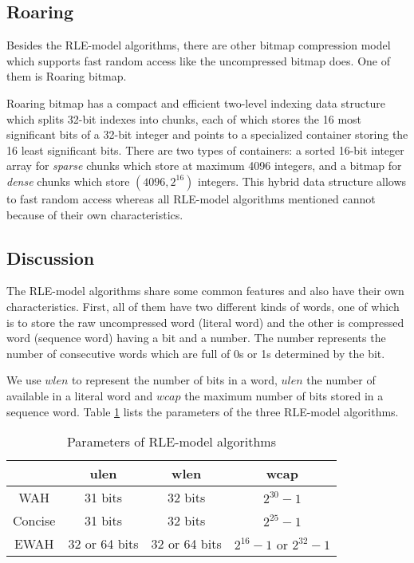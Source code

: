 \subsection{Roaring}

Besides the RLE-model algorithms, there are other bitmap compression model which supports fast random access like the uncompressed bitmap does. One of them is Roaring bitmap.

Roaring bitmap \citep{lemire2015} has a compact and efficient two-level indexing data structure which splits 32-bit indexes into chunks, each of which stores the 16 most significant bits of a 32-bit integer and points to a specialized container storing the 16 least significant bits. There are two types of containers: a sorted 16-bit integer array for \emph{sparse} chunks which store at maximum 4096 integers, and a bitmap for \emph{dense} chunks which store $(4096, 2^{16})$ integers. This hybrid data structure allows to fast random access whereas all RLE-model algorithms mentioned cannot because of their own characteristics.


\subsection{Discussion}

The RLE-model algorithms share some common features and also have their own characteristics. First, all of them have two different kinds of words, one of which is to store the raw uncompressed word (literal word) and the other is compressed word (sequence word) having a bit and a number. The number represents the number of consecutive words which are full of 0s or 1s determined by the bit.

We use $wlen$ to represent the number of bits in a word, $ulen$ the number of available in a literal word and $wcap$ the maximum number of bits stored in a sequence word. Table \ref{tbl:bm:bmparms} lists the parameters of the three RLE-model algorithms.

\begin{table}[h]
\centering
\begin{tabular}{|c|c|c|c|}
\hline
& ulen & wlen & wcap \\
\hline
WAH & 31 bits & 32 bits & $2^{30} - 1$ \\
\hline
Concise & 31 bits & 32 bits & $2^{25} - 1$ \\
\hline
EWAH & 32 or 64 bits & 32 or 64 bits & $2^{16} - 1 \text{ or } 2^{32} - 1$ \\
\hline
\end{tabular}
\caption{Parameters of RLE-model algorithms}
\label{tbl:bm:bmparms}
\end{table}

